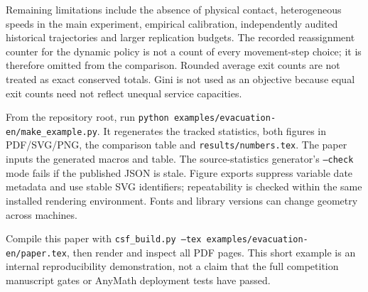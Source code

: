 \documentclass[10pt]{article}
\begin{document}
Remaining limitations include the absence of physical contact, heterogeneous speeds in the main experiment, empirical calibration, independently audited historical trajectories and larger replication budgets. The recorded reassignment counter for the dynamic policy is not a count of every movement-step choice; it is therefore omitted from the comparison. Rounded average exit counts are not treated as exact conserved totals. Gini is not used as an objective because equal exit counts need not reflect unequal service capacities.

From the repository root, run \texttt{python examples/evacuation-en/make\_example.py}. It regenerates the tracked statistics, both figures in PDF/SVG/PNG, the comparison table and \texttt{results/numbers.tex}. The paper inputs the generated macros and table. The source-statistics generator's \texttt{--check} mode fails if the published JSON is stale. Figure exports suppress variable date metadata and use stable SVG identifiers; repeatability is checked within the same installed rendering environment. Fonts and library versions can change geometry across machines.

Compile this paper with \texttt{csf\_build.py --tex examples/evacuation-en/paper.tex}, then render and inspect all PDF pages. This short example is an internal reproducibility demonstration, not a claim that the full competition manuscript gates or AnyMath deployment tests have passed.
\end{document}
